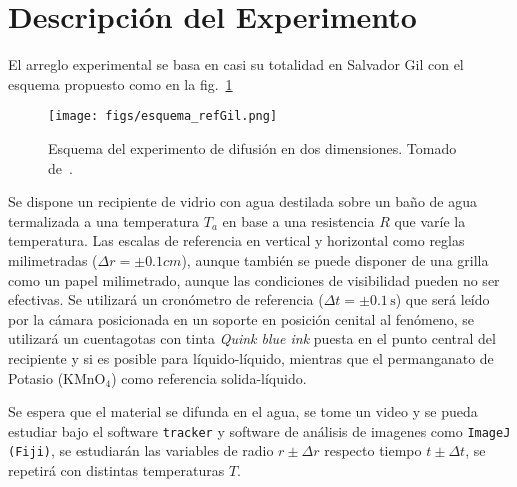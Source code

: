\documentclass{article}[13pt]
\begin{document}
\section*{Descripción del Experimento}
El arreglo experimental se basa en casi su totalidad en Salvador Gil con el esquema propuesto como en la fig.~\ref{fig:esquema_experimental}
\begin{figure}[htp]
    \centering
    \texttt{[image: figs/esquema\_refGil.png]}
\caption{Esquema del experimento de difusión en dos dimensiones. Tomado de~\cite{gilExperimentosFisicaUsando2014}.}\label{fig:esquema_experimental}
\end{figure}
Se dispone un recipiente de vidrio con agua destilada sobre un baño de agua termalizada a una temperatura $T_a$ en base a una resistencia $R$ que varíe la temperatura. Las escalas de referencia en vertical y horizontal como reglas milimetradas ($\Delta r = \pm 0.1 cm$), aunque también se puede disponer de una grilla como un papel milimetrado, aunque las condiciones de visibilidad pueden no ser efectivas. Se utilizará un cronómetro de referencia ($\Delta t = \pm 0.1 \, \unit{\second}$) que será leído por la cámara posicionada en un soporte en posición cenital al fenómeno, se utilizará un cuentagotas con tinta  \textit{Quink blue ink} puesta en el punto central del recipiente y si es posible para líquido-líquido, mientras que el permanganato de Potasio (KMnO$_4$) como referencia solida-líquido.

Se espera que el material se difunda en el agua, se tome un video y se pueda estudiar bajo el software \texttt{tracker} y software de análisis de imagenes como \texttt{ImageJ (Fiji)}, se estudiarán las variables de radio $r\pm\Delta r$ respecto tiempo $t\pm\Delta t$, se repetirá con distintas temperaturas $T$.
\end{document}
